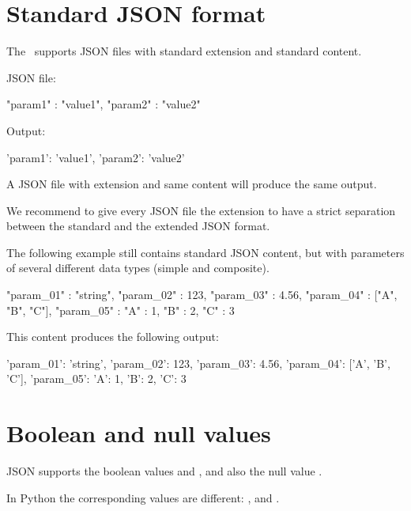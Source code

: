 \section{Standard JSON format}

The \pkg\ supports JSON files with standard extension  and standard content.

JSON file:

\begin{pythoncode}
{
   "param1" : "value1",
   "param2" : "value2"
}
\end{pythoncode}

Output:

\begin{pythonlog}
{'param1': 'value1', 'param2': 'value2'}
\end{pythonlog}

A JSON file with extension  and same content will produce the same output.

We recommend to give every JSON file the extension  to have a strict separation between the standard and the extended JSON format.

The following example still contains standard JSON content, but with parameters of several different data types (simple and composite).

\begin{pythoncode}
{
   "param_01" : "string",
   "param_02" : 123,
   "param_03" : 4.56,
   "param_04" : ["A", "B", "C"],
   "param_05" : {"A" : 1, "B" : 2, "C" : 3}
}
\end{pythoncode}

This content produces the following output:

\begin{pythonlog}
{'param_01': 'string',
 'param_02': 123,
 'param_03': 4.56,
 'param_04': ['A', 'B', 'C'],
 'param_05': {'A': 1, 'B': 2, 'C': 3}}
\end{pythonlog}


\section{Boolean and null values}

JSON supports the boolean values  and , and also the null value .

In Python the corresponding values are different: ,  and .

